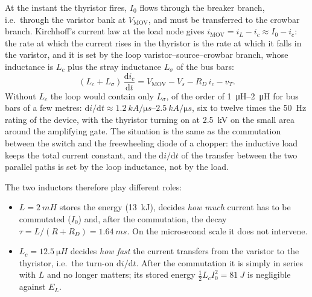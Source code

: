 \documentclass[11pt,a4paper]{article}
\begin{document}
At the instant the thyristor fires, $I_0$ flows through the breaker branch, i.e.\ through the
varistor bank at $V_{\mathrm{MOV}}$, and must be transferred to the crowbar branch. Kirchhoff's
current law at the load node gives $i_{\mathrm{MOV}} = i_L - i_c \approx I_0 - i_c$: the rate at
which the current rises in the thyristor is the rate at which it falls in the varistor, and it
is set by the loop varistor--source--crowbar branch, whose inductance is $L_c$ plus the stray
inductance $L_\sigma$ of the bus bars:
\begin{equation}
  (L_c + L_\sigma)\,\frac{\mathrm{d}i_c}{\mathrm{d}t} = V_{\mathrm{MOV}} - V_s - R_D\,i_c - v_T .
  \label{eq:loop}
\end{equation}
Without $L_c$ the loop would contain only $L_\sigma$, of the order of \SIrange{1}{2}{\micro H}
for bus bars of a few metres: $\mathrm{d}i/\mathrm{d}t \approx \SIrange{1.2}{2.5}{kA/\micro s}$,
six to twelve times the \SI{50}{Hz} rating of the device, with the thyristor turning on at
\SI{2.5}{kV} on the small area around the amplifying gate. The situation is the same as the
commutation between the switch and the freewheeling diode of a chopper: the inductive load keeps
the total current constant, and the $\mathrm{d}i/\mathrm{d}t$ of the transfer between the two
parallel paths is set by the loop inductance, not by the load.

The two inductors therefore play different roles:
\begin{itemize}
\item $L = \SI{2}{mH}$ stores the energy (\SI{13}{kJ}), decides \emph{how much} current has to
      be commutated ($I_0$) and, after the commutation, the decay $\tau = L/(R + R_D) =
      \SI{1.64}{ms}$. On the microsecond scale it does not intervene.
\item $L_c = \SI{12.5}{\micro H}$ decides \emph{how fast} the current transfers from the
      varistor to the thyristor, i.e.\ the turn-on $\mathrm{d}i/\mathrm{d}t$. After the
      commutation it is simply in series with $L$ and no longer matters; its stored energy
      $\tfrac12 L_c I_0^2 = \SI{81}{J}$ is negligible against $E_L$.
\end{itemize}
\end{document}
